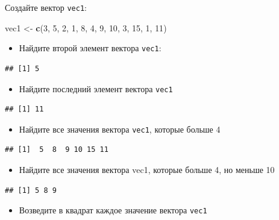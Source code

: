 \documentclass[]{book}
\newenvironment{Shaded}{\begin{snugshade}}{\end{snugshade}}
\newcommand{\DecValTok}[1]{\textcolor[rgb]{0.00,0.00,0.81}{#1}}
\newcommand{\KeywordTok}[1]{\textcolor[rgb]{0.13,0.29,0.53}{\textbf{#1}}}
\newcommand{\NormalTok}[1]{#1}
\newcommand{\StringTok}[1]{\textcolor[rgb]{0.31,0.60,0.02}{#1}}
\providecommand{\tightlist}{%
  \setlength{\itemsep}{0pt}\setlength{\parskip}{0pt}}
\begin{document}
Создайте вектор \texttt{vec1}:

\begin{Shaded}
\begin{Highlighting}[]
\NormalTok{vec1 <-}\StringTok{ }\KeywordTok{c}\NormalTok{(}\DecValTok{3}\NormalTok{, }\DecValTok{5}\NormalTok{, }\DecValTok{2}\NormalTok{, }\DecValTok{1}\NormalTok{, }\DecValTok{8}\NormalTok{, }\DecValTok{4}\NormalTok{, }\DecValTok{9}\NormalTok{, }\DecValTok{10}\NormalTok{, }\DecValTok{3}\NormalTok{, }\DecValTok{15}\NormalTok{, }\DecValTok{1}\NormalTok{, }\DecValTok{11}\NormalTok{)}
\end{Highlighting}
\end{Shaded}

\begin{itemize}
\tightlist
\item
  Найдите второй элемент вектора \texttt{vec1}:
\end{itemize}

\begin{verbatim}
## [1] 5
\end{verbatim}

\begin{itemize}
\tightlist
\item
  Найдите последний элемент вектора \texttt{vec1}
\end{itemize}

\begin{verbatim}
## [1] 11
\end{verbatim}

\begin{itemize}
\tightlist
\item
  Найдите все значения вектора \texttt{vec1}, которые больше 4
\end{itemize}

\begin{verbatim}
## [1]  5  8  9 10 15 11
\end{verbatim}

\begin{itemize}
\tightlist
\item
  Найдите все значения вектора vec1, которые больше 4, но меньше 10
\end{itemize}

\begin{verbatim}
## [1] 5 8 9
\end{verbatim}

\begin{itemize}
\tightlist
\item
  Возведите в квадрат каждое значение вектора \texttt{vec1}
\end{itemize}
\end{document}
